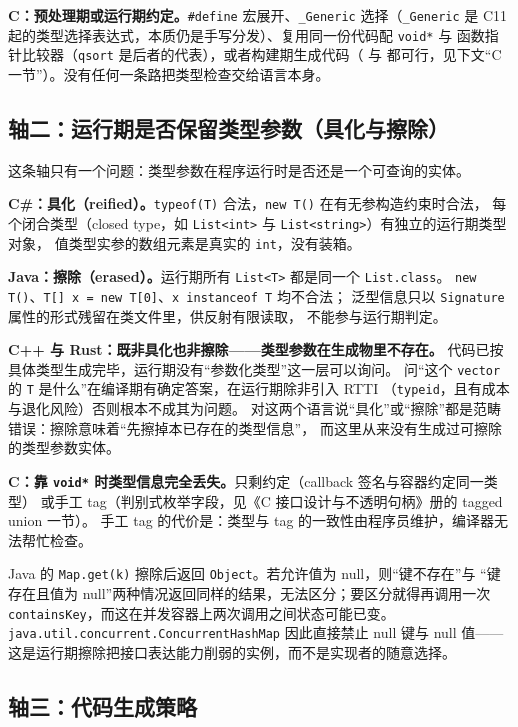 \documentclass[12pt,a4paper,fontset=fandol]{ctexbook}
\newcommand{\cmakelabel}{%
  \tcbox[on line,colback=cmheadbg,colframe=cmheadbg,
    boxrule=0pt,arc=1pt,left=2pt,right=2pt,top=1pt,bottom=1pt,
    colupper=white,fontupper=\scriptsize\bfseries]{CMake}}
\newcommand{\clabel}{%
  \tcbox[on line,colback=cheadbg,colframe=cheadbg,
    boxrule=0pt,arc=1pt,left=2pt,right=2pt,top=1pt,bottom=1pt,
    colupper=white,fontupper=\scriptsize\bfseries]{C}}
\newcommand{\cpp}[1]{C++#1}
\newcommand{\kw}[1]{\texttt{#1}}
\begin{document}
\textbf{C：预处理期或运行期约定。}\kw{\#define} 宏展开、\kw{\_Generic} 选择（\kw{\_Generic}
是 C11 起的类型选择表达式，本质仍是手写分发）、复用同一份代码配 \kw{void*} 与
函数指针比较器（\kw{qsort} 是后者的代表），或者构建期生成代码（\clabel{} 与
\cmakelabel{} 都可行，见下文“C 一节”）。没有任何一条路把类型检查交给语言本身。

\subsection{轴二：运行期是否保留类型参数（具化与擦除）}

这条轴只有一个问题：类型参数在程序运行时是否还是一个可查询的实体。

\textbf{C\#：具化（reified）。}\kw{typeof(T)} 合法，\kw{new T()} 在有无参构造约束时合法，
每个闭合类型（closed type，如 \kw{List<int>} 与 \kw{List<string>}）有独立的运行期类型对象，
值类型实参的数组元素是真实的 \kw{int}，没有装箱。

\textbf{Java：擦除（erased）。}运行期所有 \kw{List<T>} 都是同一个 \kw{List.class}。
\kw{new T()}、\kw{T[] x = new T[0]}、\kw{x instanceof T} 均不合法；
泛型信息只以 \kw{Signature} 属性的形式残留在类文件里，供反射有限读取，
不能参与运行期判定。

\textbf{\cpp{} 与 Rust：既非具化也非擦除——类型参数在生成物里不存在。}
代码已按具体类型生成完毕，运行期没有“参数化类型”这一层可以询问。
问“这个 \kw{vector} 的 \kw{T} 是什么”在编译期有确定答案，在运行期除非引入 RTTI
（\kw{typeid}，且有成本与退化风险）否则根本不成其为问题。
对这两个语言说“具化”或“擦除”都是范畴错误：擦除意味着“先擦掉本已存在的类型信息”，
而这里从来没有生成过可擦除的类型参数实体。

\textbf{C：靠 \kw{void*} 时类型信息完全丢失。}只剩约定（callback 签名与容器约定同一类型）
或手工 tag（判别式枚举字段，见《C 接口设计与不透明句柄》册的 tagged union 一节）。
手工 tag 的代价是：类型与 tag 的一致性由程序员维护，编译器无法帮忙检查。

\begin{note}[title={擦除的一处可见后果：\kw{ConcurrentHashMap} 为什么禁止 null 键值}]
Java 的 \kw{Map.get(k)} 擦除后返回 \kw{Object}。若允许值为 null，则“键不存在”与
“键存在且值为 null”两种情况返回同样的结果，无法区分；要区分就得再调用一次
\kw{containsKey}，而这在并发容器上两次调用之间状态可能已变。
\kw{java.util.concurrent.ConcurrentHashMap} 因此直接禁止 null 键与 null 值——
这是运行期擦除把接口表达能力削弱的实例，而不是实现者的随意选择。
\end{note}

\subsection{轴三：代码生成策略}
\end{document}
